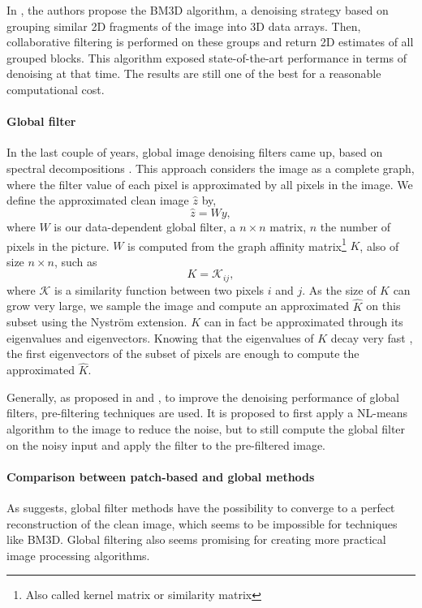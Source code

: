 In \cite{dabov_image_2007}, the authors propose the BM3D algorithm, a denoising strategy based on grouping similar 2D fragments of the image into 3D data arrays. Then, collaborative filtering is performed on these groups and return 2D estimates of all grouped blocks.
This algorithm exposed state-of-the-art performance in terms of denoising at that time.
The results are still one of the best for a reasonable computational cost.

\paragraph{Global filter}

In the last couple of years, global image denoising filters came up, based on spectral decompositions \cite{glide_2014}.
This approach considers the image as a complete graph, where the filter value of each pixel is approximated by all pixels in the image.
We define the approximated clean image \(\hat{z}\) by,
\[\hat{z} = Wy,\]
where \(W\) is our data-dependent global filter, a \(n \times n\) matrix, \(n\) the number of pixels in the picture.
\(W\) is computed from the graph affinity matrix\footnote{Also called kernel matrix or similarity matrix} \(K\), also of size \(n \times n\), such as
\[K = {\mathcal{K}_{ij}},\]
where \(\mathcal{K}\) is a similarity function between two pixels \(i\) and \(j\).
As the size of \(K\) can grow very large, we sample the image and compute an approximated \(\hat{K}\) on this subset using the Nystr\"om extension.
\(K\) can in fact be approximated through its eigenvalues and eigenvectors.
Knowing that the eigenvalues of \(K\) decay very fast \cite{siam_slides_2016}, the first eigenvectors of the subset of pixels are enough to compute the approximated \(\hat{K}\).

Generally, as proposed in \cite{glide_2014} and \cite{talebi_asymptotic_2016}, to improve the denoising performance of global filters, pre-filtering techniques are used.
It is proposed to first apply a NL-means algorithm to the image to reduce the noise, but to still compute the global filter on the noisy input and apply the filter to the pre-filtered image.

\paragraph{Comparison between patch-based and global methods}

As \cite{talebi_asymptotic_2016} suggests, global filter methods have the possibility to converge to a perfect reconstruction of the clean image, which seems to be impossible for techniques like BM3D.
Global filtering also seems promising for creating more practical image processing algorithms.

